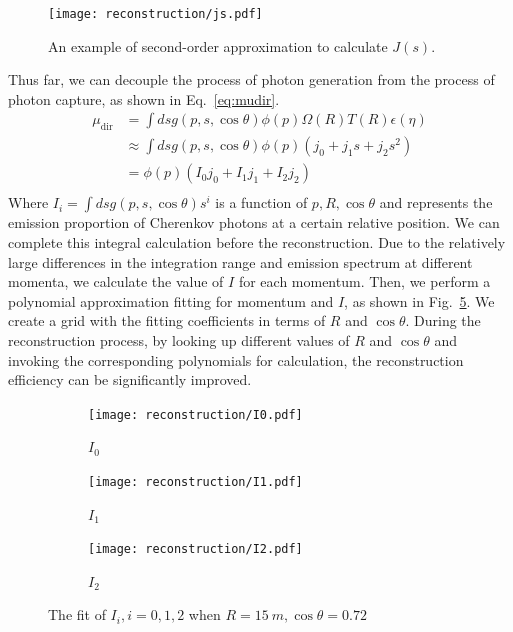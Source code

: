 \begin{figure}
	\begin{center}
		\texttt{[image: reconstruction/js.pdf]}
	\end{center}
	\caption{An example of second-order approximation to calculate $J(s)$.}
	\label{fig:js}
\end{figure}
Thus far, we can decouple the process of photon generation from the process of photon capture, as shown in Eq.~\eqref{eq:mudir}.
\begin{equation}
	\begin{aligned}
		\mu_{\mathrm{dir}} & =\int ds g(p,s,\cos\theta)\phi(p)\Omega(R)T(R)\epsilon(\eta) \\
		                   & \approx \int ds g(p,s,\cos\theta)\phi(p)(j_0 + j_1s+j_2s^2)  \\
		                   & =\phi(p)(I_0j_0+I_1j_1+I_2j_2)                               \\
	\end{aligned}
	\label{eq:mudir}
\end{equation}
Where $I_i = \int ds g(p,s,\cos\theta)s^i$ is a function of $p, R, \cos\theta$ and represents the emission proportion of Cherenkov photons at a certain relative position. We can complete this integral calculation before the reconstruction.
Due to the relatively large differences in the integration range and emission spectrum at different momenta, we calculate the value of \(I\) for each momentum. Then, we perform a polynomial approximation fitting for momentum and \(I\), as shown in Fig.~\ref{fig:I_fit}. We create a grid with the fitting coefficients in terms of \(R\) and \(\cos\theta\). During the reconstruction process, by looking up different values of \(R\) and \(\cos\theta\) and invoking the corresponding polynomials for calculation, the reconstruction efficiency can be significantly improved.
\begin{figure}[h]
	\centering
	\begin{subfigure}{0.5\textwidth}
		\centering
		\texttt{[image: reconstruction/I0.pdf]}
		\caption{$I_0$}
		\label{fig:I0}
	\end{subfigure}%
	\hfill
	\begin{subfigure}{0.5\textwidth}
		\centering
		\texttt{[image: reconstruction/I1.pdf]}
		\caption{$I_1$}
		\label{fig:I1}
	\end{subfigure}%
	\hfill
	\begin{subfigure}{0.5\textwidth}
		\centering
		\texttt{[image: reconstruction/I2.pdf]}
		\caption{$I_2$}
		\label{fig:I2}
	\end{subfigure}
	\caption{The fit of $I_i,i=0,1,2$ when $R=\SI{15}{m},\cos\theta=0.72$}
	\label{fig:I_fit}
\end{figure}

